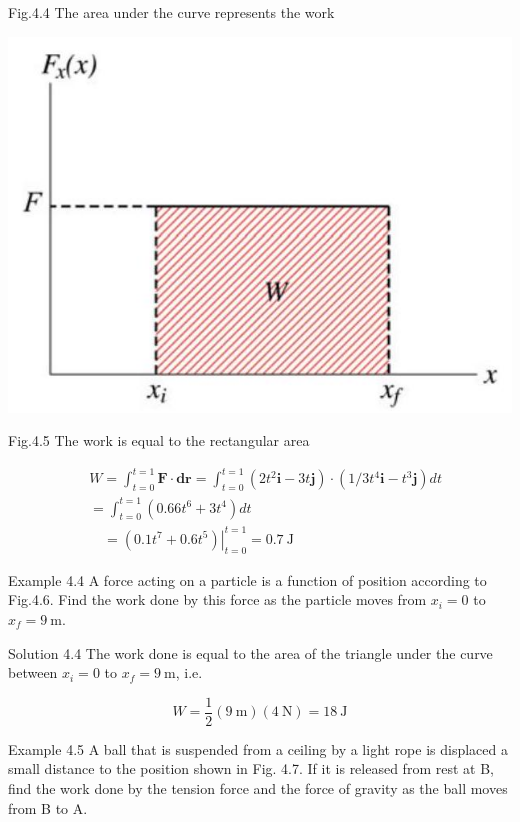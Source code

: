 \documentclass[10pt]{article}
\begin{document}
Fig.4.4 The area under the curve represents the work

\begin{center}
\includegraphics[max width=\textwidth]{2024_09_13_db1f357d2aad0a03eb2eg-064(1)}
\end{center}

Fig.4.5 The work is equal to the rectangular area

$$
\begin{aligned}
& W= \int_{t=0}^{t=1} \mathbf{F} \cdot \mathbf{d r}=\int_{t=0}^{t=1}\left(2 t^{2} \mathbf{i}-3 t \mathbf{j}\right) \cdot\left(1 / 3 t^{4} \mathbf{i}-t^{3} \mathbf{j}\right) d t \\
&= \int_{t=0}^{t=1}\left(0.66 t^{6}+3 t^{4}\right) d t \\
& \quad=\left.\left(0.1 t^{7}+0.6 t^{5}\right)\right|_{t=0} ^{t=1}=0.7 \mathrm{~J}
\end{aligned}
$$

Example 4.4 A force acting on a particle is a function of position according to Fig.4.6. Find the work done by this force as the particle moves from $x_{i}=0$ to $x_{f}=9 \mathrm{~m}$.

Solution 4.4 The work done is equal to the area of the triangle under the curve between $x_{i}=0$ to $x_{f}=9 \mathrm{~m}$, i.e.

$$
W=\frac{1}{2}(9 \mathrm{~m})(4 \mathrm{~N})=18 \mathrm{~J}
$$

Example 4.5 A ball that is suspended from a ceiling by a light rope is displaced a small distance to the position shown in Fig. 4.7. If it is released from rest at B, find the work done by the tension force and the force of gravity as the ball moves from B to A.
\end{document}

